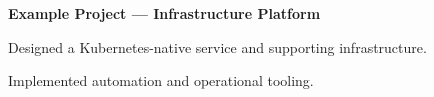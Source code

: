 \textbf{Example Project --- Infrastructure Platform}

\begin{cvitems}
    \item Designed a Kubernetes-native service and supporting infrastructure.
    \item Implemented automation and operational tooling.
\end{cvitems}
